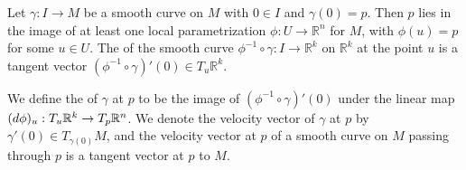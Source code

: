 \documentclass[notoc,notitlepage]{tufte-book}
\begin{document}
\begin{defn}\label{defn:velocity_vectors_on_a_submanifold}
  Let $\gamma : I \to M$ be a smooth curve on $M$ with $0 \in I$ and $\gamma(0)
  = p$. Then $p$ lies in the image of at least one local parametrization $\phi :
  U \to \mathbb{R}^n$ for $M$, with $\phi(u) = p$ for some $u \in U$. The
   of the smooth curve $\phi^{-1} \circ \gamma : I \to
  \mathbb{R}^k$ on $\mathbb{R}^k$ at the point $u$ is a tangent vector
  $(\phi^{-1} \circ \gamma)'(0) \in T_{u} \mathbb{R}^k$.
  
  We define the  of $\gamma$ at $p$ to be the image of
  $(\phi^{-1} \circ \gamma)'(0)$ under the linear map $(\mathop{}\!d{\phi})_u : T_{u}
  \mathbb{R}^k \to T_{p} \mathbb{R}^n$. We denote the velocity vector of
  $\gamma$ at $p$ by $\gamma'(0) \in T_{\gamma(0)} M$, and the velocity vector
  at $p$ of a smooth curve on $M$ passing through $p$ is a tangent vector at $p$
  to $M$.
\end{defn}
\end{document}
